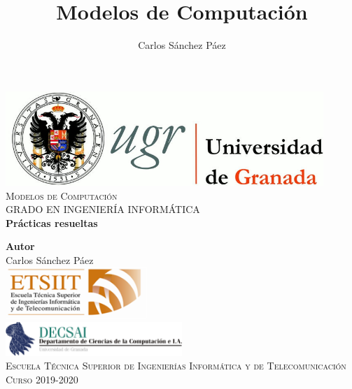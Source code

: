\documentclass[12pt,spanish]{article}
\title{Modelos de Computación}
\author{Carlos Sánchez Páez}
\begin{document}
\lstset{columns=fullflexible,basicstyle=\ttfamily}


\begin{titlepage}

 \newlength{\centeroffset}
 \setlength{\centeroffset}{-0.5\oddsidemargin}
 \addtolength{\centeroffset}{0.5\evensidemargin}
 \thispagestyle{empty}

 \noindent\hspace*{\centeroffset}
 \begin{minipage}{\textwidth}

  \centering
  \includegraphics[width=0.9\textwidth]{logo_ugr.jpg}\\[1.4cm]

  \textsc{ \Large Modelos de Computación\\[0.2cm]}
  \textsc{GRADO EN INGENIERÍA INFORMÁTICA}\\[1cm]

  {\Huge\bfseries Prácticas resueltas\\}
 \end{minipage}

 \vspace{1.5cm}
 \noindent\hspace*{\centeroffset}
 \begin{minipage}{\textwidth}
  \centering

  \textbf{Autor}\\ {Carlos Sánchez Páez}\\[4ex]
  \includegraphics[width=0.4\textwidth]{etsiit_logo.png}\\[0.1cm]
  \vspace{1.5cm}
  \includegraphics[width=0.5\textwidth]{decsai.jpg}\\[0.1cm]
  \vspace{1cm}
  \textsc{Escuela Técnica Superior de Ingenierías Informática y de Telecomunicación}\\
  \vspace{1cm}
  \textsc{Curso 2019-2020}
 \end{minipage}
\end{titlepage}
\thispagestyle{empty}
\newpage
\tableofcontents{}
\newpage
\end{document}
